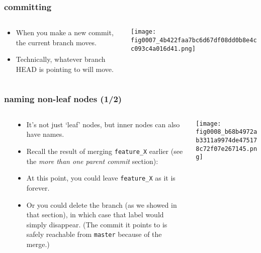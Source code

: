 \documentclass[presentation]{beamer}
\begin{document}
\begin{frame}
\frametitle{committing}
\label{sec-3-6}
\begin{columns}
\begin{column}{0.6\textwidth}
\label{sec-3-6-1}


\begin{itemize}
\item When you make a new commit, the current branch moves.
\item Technically, whatever
  branch HEAD is pointing to will move.
\end{itemize}
\end{column}
\begin{column}{0.4\textwidth}
\label{sec-3-6-2}


\texttt{[image: fig0007\_4b422faa7bc6d67df08dd0b8e4cc093c4a016d41.png]}
\end{column}
\end{columns}
\end{frame}
\begin{frame}
\frametitle{naming non-leaf nodes (1/2)}
\label{sec-3-7}
\begin{columns} %
\label{sec-3-7-1}
\begin{column}{0.6\textwidth}
\label{sec-3-7-1-1}


\begin{itemize}
\item It's not just `leaf' nodes, but inner nodes can also have names.
\item Recall the result of merging \texttt{feature\_X} earlier (see the \emph{more than one parent commit} section):
\item At this point, you could leave \texttt{feature\_X} as it is forever.
\item Or you could
  delete the branch (as we showed in that section), in which case that label
  would simply disappear.  (The commit it points to is safely reachable from
  \texttt{master} because of the merge.)
\end{itemize}
\end{column}
\begin{column}{0.4\textwidth}
\label{sec-3-7-1-2}


\texttt{[image: fig0008\_b68b4972ab3311a9974de475178c72f07e267145.png]}
\end{column}
\end{columns}
\label{sec-3-7-2}


\small
\end{frame}
\end{document}
